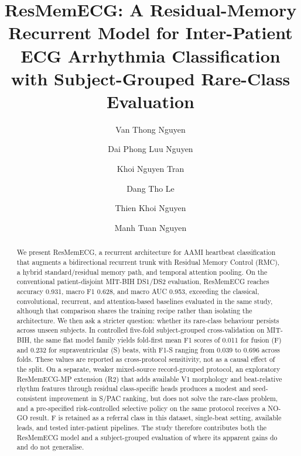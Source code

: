 \documentclass[review,12pt]{elsarticle}
\def\corref#1{}%
\def\,{ }%
\begin{document}
\begin{frontmatter}

\title{ResMemECG: A Residual-Memory Recurrent Model for Inter-Patient ECG
Arrhythmia Classification with Subject-Grouped Rare-Class Evaluation}

\author[ueh]{Van Thong Nguyen\,}

\author[ueh]{Dai Phong Luu Nguyen\,}

\author[ueh]{Khoi Nguyen Tran\,}

\author[ueh]{Dang Tho Le\,}

\author[ueh]{Thien Khoi Nguyen\,}

\author[ueh]{Manh Tuan Nguyen\,\corref{cor1}}


\begin{abstract}
We present ResMemECG, a recurrent architecture for AAMI heartbeat
classification that augments a bidirectional recurrent trunk with Residual
Memory Control (RMC), a hybrid standard/residual memory path, and temporal
attention pooling. On the
conventional patient-disjoint MIT-BIH DS1/DS2 evaluation, ResMemECG reaches
accuracy 0.931, macro F1 0.628, and macro AUC 0.953, exceeding the
classical, convolutional, recurrent, and attention-based baselines evaluated in
the same study, although that comparison shares the training recipe rather than
isolating the architecture. We then ask a stricter question: whether its rare-class behaviour
persists across unseen subjects. In controlled five-fold subject-grouped
cross-validation on MIT-BIH, the same flat model family yields fold-first
mean F1 scores of 0.011 for fusion (F) and 0.232 for supraventricular (S)
beats, with F1-S ranging from 0.039 to 0.696 across folds. These values are
reported as cross-protocol sensitivity, not as a causal effect of the split. On
a separate, weaker mixed-source record-grouped protocol, an exploratory
ResMemECG-MP extension (R2) that adds available V1 morphology and beat-relative
rhythm features through residual class-specific heads produces a modest and
seed-consistent improvement in S/PAC ranking, but does not solve the rare-class
problem, and a pre-specified risk-controlled selective policy on the same
protocol receives a NO-GO result. F is retained as a referral class in this
dataset, single-beat setting, available leads, and tested inter-patient
pipelines. The
study therefore contributes both the ResMemECG model and a subject-grouped
evaluation of where its apparent gains do and do not generalise.
\end{abstract}


\end{frontmatter}
\end{document}
